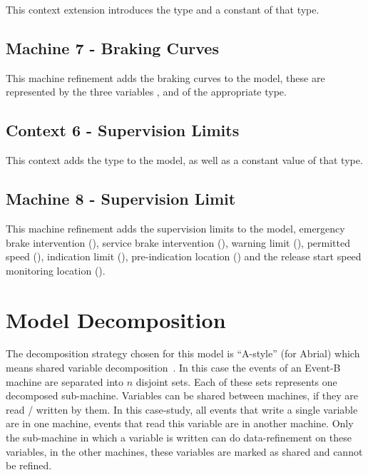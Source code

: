 \documentclass{template/openetcs_article}
\begin{document}
This context extension introduces the type  and a
constant of that type.

{\footnotesize

}

\subsection{Machine 7 - Braking Curves}
\label{sec:machine-7-braking}

This machine refinement adds the braking curves to the model, these are
represented by the three variables ,  and  of the
appropriate type.

{\footnotesize

}

\subsection{Context 6 - Supervision Limits}
\label{sec:cont-6-superv}

This context adds the type  to the model, as well
as a constant value of that type.

{\footnotesize

}

\subsection{Machine 8 - Supervision Limit}
\label{sec:mach-8-superv}

This machine refinement adds the supervision limits to the model, emergency
brake intervention (), service brake intervention (),
warning limit (), permitted speed (),
indication limit (), pre-indication location ()
and the release start speed monitoring location ().

{\footnotesize

}

\section{Model Decomposition}
\label{sec:model-decomposition}

The decomposition strategy chosen for this model is ``A-style'' (for Abrial)
which means shared variable decomposition~\cite{silva2011decomposition}. In this
case the events of an Event-B machine are separated into $n$ disjoint sets. Each
of these sets represents one decomposed sub-machine. Variables can be shared
between machines, if they are read / written by them. In this case-study, all
events that write a single variable are in one machine, events that read this
variable are in another machine. Only the sub-machine in which a variable is
written can do data-refinement on these variables, in the other machines, these
variables are marked as shared and cannot be refined.
\end{document}

